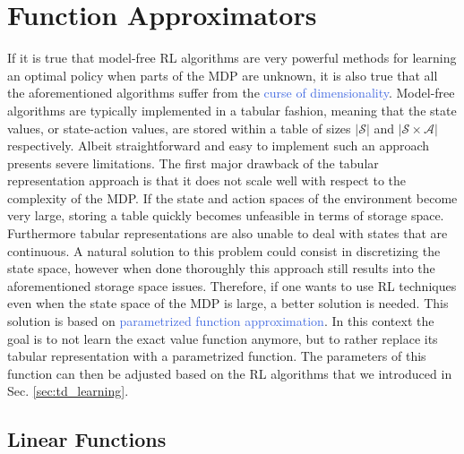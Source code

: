 \section{Function Approximators}
\label{sec:function_approximators}
If it is true that model-free RL algorithms are very powerful methods for learning an optimal policy when parts of the MDP are unknown, it is also true that all the aforementioned algorithms suffer from the \textcolor{RoyalBlue}{curse of dimensionality}. Model-free algorithms are typically implemented in a tabular fashion, meaning that the state values, or state-action values, are stored within a table of sizes $|\mathcal{S}|$ and $|\mathcal{S}\times\mathcal{A}|$ respectively. Albeit straightforward and easy to implement such an approach presents severe limitations. The first major drawback of the tabular representation approach is that it does not scale well with respect to the complexity of the MDP. If the state and action spaces of the environment become very large, storing a table quickly becomes unfeasible in terms of storage space. Furthermore tabular representations are also unable to deal with states that are continuous. A natural solution to this problem could consist in discretizing the state space, however when done thoroughly this approach still results into the aforementioned storage space issues. Therefore, if one wants to use RL techniques even when the state space of the MDP is large, a better solution is needed. This solution is based on \textcolor{RoyalBlue}{parametrized function approximation}. In this context the goal is to not learn the exact value function anymore, but to rather replace its tabular representation with a parametrized function. The parameters of this function can then be adjusted based on the RL algorithms that we introduced in Sec. \ref{sec:td_learning}. 


\subsection{Linear Functions}
\label{sec:linear_functions}


